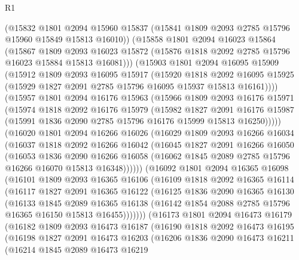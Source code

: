 \begin{lexlean}{R1}
\begin{coremodule}
    (@15832 @1801 @2094 @15960 @15837 (@15841 @1809 @2093 @2785 @15796 @15960 @15849 @15813 @16010))
    (@15858
      @1801
      @2094
      @16023
      @15864
      (@15867
        @1809
        @2093
        @16023
        @15872
        (@15876 @1818 @2092 @2785 @15796 @16023 @15884 @15813 @16081)))
    (@15903
      @1801
      @2094
      @16095
      @15909
      (@15912
        @1809
        @2093
        @16095
        @15917
        (@15920
          @1818
          @2092
          @16095
          @15925
          (@15929 @1827 @2091 @2785 @15796 @16095 @15937 @15813 @16161))))
    (@15957
      @1801
      @2094
      @16176
      @15963
      (@15966
        @1809
        @2093
        @16176
        @15971
        (@15974
          @1818
          @2092
          @16176
          @15979
          (@15982
            @1827
            @2091
            @16176
            @15987
            (@15991 @1836 @2090 @2785 @15796 @16176 @15999 @15813 @16250)))))
    (@16020
      @1801
      @2094
      @16266
      @16026
      (@16029
        @1809
        @2093
        @16266
        @16034
        (@16037
          @1818
          @2092
          @16266
          @16042
          (@16045
            @1827
            @2091
            @16266
            @16050
            (@16053
              @1836
              @2090
              @16266
              @16058
              (@16062 @1845 @2089 @2785 @15796 @16266 @16070 @15813 @16348))))))
    (@16092
      @1801
      @2094
      @16365
      @16098
      (@16101
        @1809
        @2093
        @16365
        @16106
        (@16109
          @1818
          @2092
          @16365
          @16114
          (@16117
            @1827
            @2091
            @16365
            @16122
            (@16125
              @1836
              @2090
              @16365
              @16130
              (@16133
                @1845
                @2089
                @16365
                @16138
                (@16142 @1854 @2088 @2785 @15796 @16365 @16150 @15813 @16455)))))))
    (@16173
      @1801
      @2094
      @16473
      @16179
      (@16182
        @1809
        @2093
        @16473
        @16187
        (@16190
          @1818
          @2092
          @16473
          @16195
          (@16198
            @1827
            @2091
            @16473
            @16203
            (@16206
              @1836
              @2090
              @16473
              @16211
              (@16214
                @1845
                @2089
                @16473
                @16219

\end{coremodule}
\end{lexlean}
